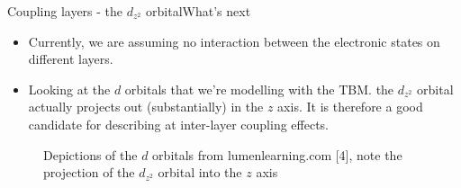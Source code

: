 \documentclass[9pt]{beamer}
\begin{document}
\begin{frame}{Coupling layers - the $d_{z^2}$ orbital}{What's next}
  \begin{itemize}
    \item Currently, we are assuming no interaction between the electronic states on different layers.

    \item Looking at the $d$ orbitals that we're modelling with the TBM. the $d_{z^2}$ orbital actually projects out (substantially) in the $z$ axis. It is therefore a good candidate for describing at inter-layer coupling effects.
  \end{itemize}

  \begin{figure}
    \centering
    \caption{Depictions of the $d$ orbitals from lumenlearning.com [4], note the projection of the $d_{z^2}$ orbital into the $z$ axis}
  \end{figure}
\end{frame}
\end{document}
